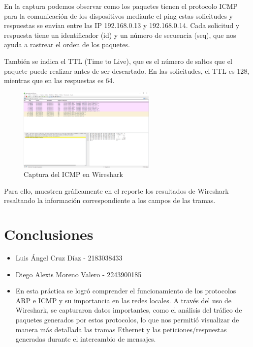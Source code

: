 \begin{enumerate}
            En la captura podemos observar como los paquetes tienen el protocolo ICMP para la comunicación de los dispositivos mediante el ping estas solicitudes y respuestas se envían entre las IP 192.168.0.13 y 192.168.0.14. Cada solicitud y respuesta tiene un identificador (id) y un número de secuencia (seq), que nos ayuda a rastrear el orden de los paquetes.

            También se indica el TTL (Time to Live), que es el número de saltos que el paquete puede realizar antes de ser descartado. En las solicitudes, el TTL es 128, mientras que en las respuestas es 64.
            \begin{figure}[H]
                \centering
                \includegraphics[width=0.6\textwidth]{img/ICMP.PNG}
                \caption{Captura del ICMP en Wireshark}
                \label{fig:ICMP}
            \end{figure}
            
        \end{enumerate}
        Para ello, muestren gráficamente en el reporte los resultados de Wireshark resaltando la información correspondiente a los campos de las tramas.
    
    \section{Conclusiones}

    \begin{itemize}
        \item Luis Ángel Cruz Díaz - 2183038433 \\
        
        \item Diego Alexis Moreno Valero - 2243900185
        \item 
        En esta práctica se logró comprender el funcionamiento de los protocolos ARP e ICMP y su importancia en las redes locales. A través del uso de Wireshark, se capturaron datos importantes, como el análisis del tráfico de paquetes generados por estos protocolos, lo que nos permitió visualizar de manera más detallada las tramas Ethernet y las peticiones/respuestas generadas durante el intercambio de mensajes.
        
    \end{itemize}
    
